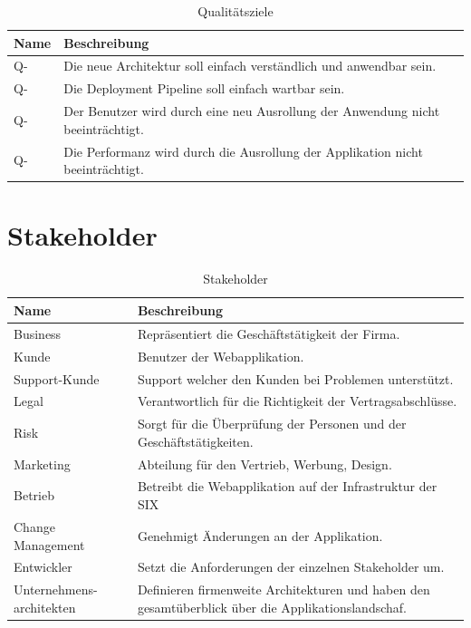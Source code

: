 \begin{table}[H]
	\centering
	\caption{Qualitätsziele}
	\begin{tabular}{ | p{3cm} | p{13cm} | }
		\toprule
		{\textbf{Name}} & {\textbf{Beschreibung}} \\
		\midrule
		Q-\arabic{quatar} \stepcounter{quatar} & Die neue Architektur soll einfach verständlich und anwendbar sein.\\ \hline
		Q-\arabic{quatar} \stepcounter{quatar} & Die Deployment Pipeline soll einfach wartbar sein. \\ \hline
		Q-\arabic{quatar} \stepcounter{quatar} & Der Benutzer wird durch eine neu Ausrollung der Anwendung nicht beeinträchtigt. \\ \hline
		Q-\arabic{quatar} \stepcounter{quatar} & Die Performanz wird durch die Ausrollung der Applikation nicht beeinträchtigt.\\ 
		\bottomrule
	\end{tabular}
\end{table}

\section{Stakeholder}

\begin{table}[H]
	\centering
	\caption{Stakeholder}
	\begin{tabular}{ | p{3cm} | p{13cm} | }
		\toprule
		{\textbf{Name}} & {\textbf{Beschreibung}} \\
		\midrule
		Business & Repräsentiert die Geschäftstätigkeit der Firma.\\ \hline
		Kunde & Benutzer der Webapplikation. \\ \hline
		Support-Kunde & Support welcher den Kunden bei Problemen unterstützt. \\ \hline
		Legal &  Verantwortlich für die Richtigkeit der Vertragsabschlüsse. \\ \hline
		Risk & Sorgt für die Überprüfung der Personen und der Geschäftstätigkeiten. \\ \hline
		Marketing & Abteilung für den Vertrieb, Werbung, Design. \\ \hline
		Betrieb & Betreibt die Webapplikation auf der Infrastruktur der SIX \\ \hline
		Change Management & Genehmigt Änderungen an der Applikation. \\ \hline
		Entwickler & Setzt die Anforderungen der einzelnen Stakeholder um. \\  \hline
		Unternehmens-architekten & Definieren firmenweite Architekturen und haben den gesamtüberblick über die Applikationslandschaf.\\ 
		\bottomrule
	\end{tabular}
\end{table}